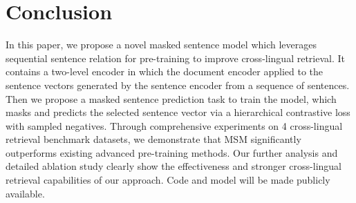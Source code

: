 \documentclass{article} %
\begin{document}



\section{Conclusion}
In this paper, we propose a novel masked sentence model which leverages sequential sentence relation for pre-training to improve cross-lingual retrieval. It contains a two-level encoder in which the document encoder applied to the sentence vectors generated by the sentence encoder from a sequence of sentences. Then we propose a masked sentence prediction task to train the model, which masks and predicts the selected sentence vector via a hierarchical contrastive loss with sampled negatives. Through comprehensive experiments on 4 cross-lingual retrieval benchmark datasets, we demonstrate that MSM significantly outperforms existing advanced pre-training methods. Our further analysis and detailed ablation study clearly show the effectiveness and stronger cross-lingual retrieval capabilities of our approach. Code and model will be made publicly available.



% 



\appendix


\end{document}
